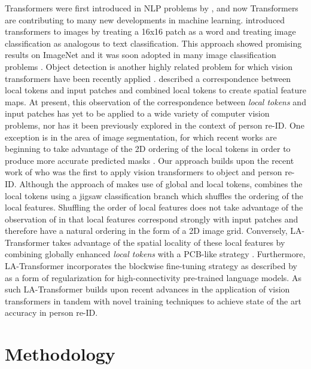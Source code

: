 \documentclass{article}
\begin{document}
Transformers were first introduced in NLP problems by \citet{Transformer}, and now Transformers are contributing to many new developments in machine learning. \citet{ViT} introduced transformers to images by treating a 16x16 patch as a word and treating image classification as analogous to text classification. This approach showed promising results on ImageNet and it was soon adopted in many image classification problems \citep{image_tranformer, nonlocal}.  Object detection is another highly related problem for which vision transformers have been recently applied  \citep{DETR, transformerbased_obj_detection}.   \citet{transformerbased_obj_detection} described a correspondence between local tokens and input patches and combined local tokens to create spatial feature maps. At present, this observation of the correspondence between \textit{local tokens} and input patches has yet to be applied to a wide variety of computer vision problems, nor has it been previously explored in the context of person re-ID.  One exception is in the area of image segmentation, for which recent works are beginning to take advantage of the 2D ordering of the local tokens in order to produce more accurate predicted masks \citep{visualTransformer, pyramidVT, transunet}. Our approach builds upon the recent work of \citet{TransReID} who was the first to apply vision transformers to object and person re-ID.  Although the approach of \citet{TransReID} makes use of global and local tokens, \citet{TransReID} combines the local tokens using a jigsaw classification branch which shuffles the ordering of the local features.  Shuffling the order of local features does not take advantage of the observation of \citet{transformerbased_obj_detection} in that local features correspond strongly with input patches and therefore have a natural ordering in the form of a 2D image grid.  Conversely, LA-Transformer takes advantage of the spatial locality of these local features by combining globally enhanced \textit{local tokens} with a PCB-like strategy \citep{PCB}.  Furthermore, LA-Transformer incorporates the blockwise fine-tuning strategy as described by \cite{ULMFit} as a form of regularization for high-connectivity pre-trained language models.  As such LA-Transformer builds upon recent advances in the application of vision transformers in tandem with novel training techniques to achieve state of the art accuracy in person re-ID.

\section{Methodology}
\end{document}
